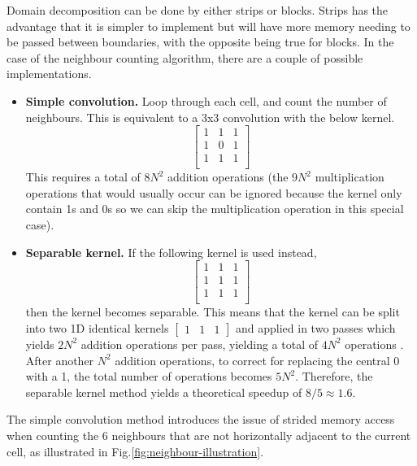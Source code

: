     Domain decomposition can be done by either strips or blocks.
    Strips has the advantage that it is simpler to implement but will have more memory needing to be passed between
    boundaries, with the opposite being true for blocks.
    In the case of the neighbour counting algorithm, there are a couple of possible implementations.
    \begin{itemize}
        \item \textbf{Simple convolution.} Loop through each cell, and count the number of neighbours.
            This is equivalent to a 3x3 convolution with the below kernel.
            \begin{equation}
            \begin{bmatrix}
            1 & 1 & 1 \\
            1 & 0 & 1 \\
            1 & 1 & 1 \\
            \end{bmatrix}\label{eq:kernel1}
            \end{equation}
            This requires a total of $8N^{2}$ addition operations (the $9N^{2}$ multiplication operations that would usually occur can
            be ignored because the kernel only contain 1s and 0s so we can skip the multiplication operation in this special case).
        \item \textbf{Separable kernel.} If the following kernel is used instead,
            \begin{equation}
            \begin{bmatrix}
            1 & 1 & 1 \\
            1 & 1 & 1 \\
            1 & 1 & 1 \\
            \end{bmatrix}\label{eq:kernel2}
            \end{equation}
            then the kernel becomes separable.
            This means that the kernel can be split into two 1D identical kernels \(\begin{bmatrix} 1 & 1 & 1 \end{bmatrix}\) and
            applied in two passes which yields $2N^{2}$ addition operations per pass, yielding a total of $4N^{2}$ operations \cite{separable-kernel}.
            After another ${N^{2}}$ addition operations, to correct for replacing the central 0 with a 1, the total number of
            operations becomes $5N^{2}$.
            Therefore, the separable kernel method yields a theoretical speedup of $8/5 \approx 1.6$.
    \end{itemize}
    The simple convolution method introduces the issue of strided memory access when counting the 6 neighbours that are
    not horizontally adjacent to the current cell, as illustrated in Fig.\eqref{fig:neighbour-illustration}.

